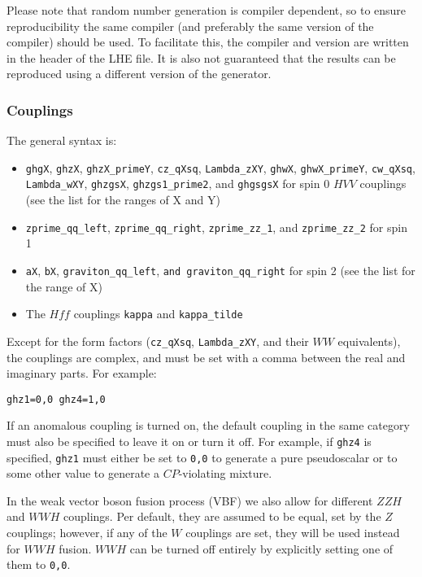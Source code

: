 \documentclass[aps,superscriptaddress,nofootinbib]{revtex4}
\begin{document}
\begin{itemize}
\begin{itemize}
Please note that random number generation is compiler dependent, so to ensure reproducibility the same compiler (and preferably the same version of the compiler) should be used.  To facilitate this, the compiler and version are written in the header of the LHE file.  It is also not guaranteed that the results can be reproduced using a different version of the generator.
\end{itemize}
\subsubsection{Couplings}
The general syntax is:
\begin{itemize}
\item \verb|ghgX|, \verb|ghzX|, \verb|ghzX_primeY|, \verb|cz_qXsq|, \verb|Lambda_zXY|, \verb|ghwX|, \verb|ghwX_primeY|, \verb|cw_qXsq|, \verb|Lambda_wXY|, \verb|ghzgsX|, \verb|ghzgs1_prime2|, and \verb|ghgsgsX| for spin 0 $HVV$ couplings (see the list for the ranges of X and Y)
\item \verb|zprime_qq_left|, \verb|zprime_qq_right|, \verb|zprime_zz_1|, and \verb|zprime_zz_2| for spin 1
\item \verb|aX|, \verb|bX|, \verb|graviton_qq_left|, \verb|and graviton_qq_right| for spin 2 (see the list for the range of X)
\item The $Hff$ couplings \verb|kappa| and \verb|kappa_tilde|
\end{itemize}
Except for the form factors (\verb|cz_qXsq|, \verb|Lambda_zXY|, and their $WW$ equivalents), the couplings are complex, and must be set with a comma between the real and imaginary parts.  For example:
\begin{verbatim}
ghz1=0,0 ghz4=1,0
\end{verbatim}
If an anomalous coupling is turned on, the default coupling in the same category must also be specified to leave it on or turn it off.  For example, if \verb|ghz4| is specified, \verb|ghz1| must either be set to \verb|0,0| to generate a pure pseudoscalar or to some other value to generate a $CP$-violating mixture.

In the weak vector boson fusion process (VBF) we also allow for different $ZZH$ and $WWH$ couplings.  Per default, they are assumed to be equal, set by the $Z$ couplings; however, if any of the $W$ couplings are set, they will be used instead for $WWH$ fusion.  $WWH$ can be turned off entirely by explicitly setting one of them to \verb|0,0|.

\end{itemize}
\end{document}
